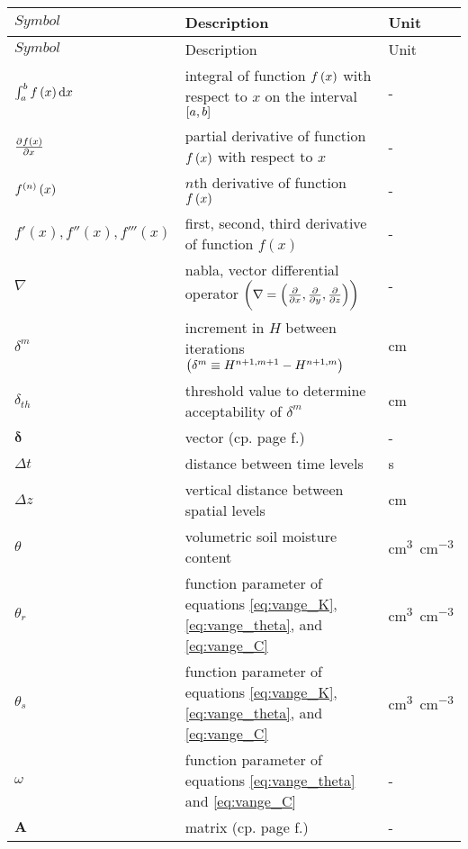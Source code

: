 {  %
  \begin{longtabu}{l L l}
    \toprule
    $Symbol$ & Description & Unit \\
    \midrule
    \endfirsthead
    $Symbol$ & Description & Unit \\
    \midrule
    \endhead
    \bottomrule
    \endlastfoot
    $\int_a^b{f\del{ x }}\dif x$ & integral of function $f\del{ x }$ with respect to $x$ on the interval $\intcc{a,b}$ & - \\
    $\pd{f\del{ x }}{x}$ & partial derivative of function $f\del{ x }$ with respect to $x$ & - \\
    $f^{\del{ n }}\del{ x }$ & $n$th derivative of function $f\del{ x }$ & - \\
    $f'(x), f''(x), f'''(x)$ & first, second, third derivative of function $f(x)$ & - \\
    $\nabla$ & nabla, vector differential operator $\del{ \nabla = \del{  \frac{\partial}{\partial x}, \frac{\partial}{\partial y}, \frac{\partial}{\partial z}  } }$ & - \\
    $\delta^m$ & increment in $H$ between iterations $\del{ \delta^m \equiv H^{n+1,m+1} - H^{n+1,m} }$ & \si{\centi\meter} \\
    $\delta_{th}$ & threshold value to determine acceptability of $\delta^m$ & \si{\centi\meter} \\
    $\boldsymbol{\delta}$ & vector (cp. page \pageref{eq:vec_delta} f.) & - \\
    $\Delta t$ & distance between time levels & \si{\second} \\
    $\Delta z$ & vertical distance between spatial levels & \si{\centi\meter} \\
    $\theta$ & volumetric soil moisture content & \si{\cubic\centi\meter\per\cubic\centi\meter} \\
    $\theta_r$ & function parameter of equations \eqref{eq:vange_K}, \eqref{eq:vange_theta}, and \eqref{eq:vange_C} & \si{\cubic\centi\meter\per\cubic\centi\meter} \\
    $\theta_s$ & function parameter of equations \eqref{eq:vange_K}, \eqref{eq:vange_theta}, and \eqref{eq:vange_C} & \si{\cubic\centi\meter\per\cubic\centi\meter} \\
    $\omega$ & function parameter of equations \eqref{eq:vange_theta} and \eqref{eq:vange_C} & - \\
    $\mathbf{A}$ & matrix (cp. page \pageref{eq:mat_A} f.) & - \\

\end{longtabu}}
